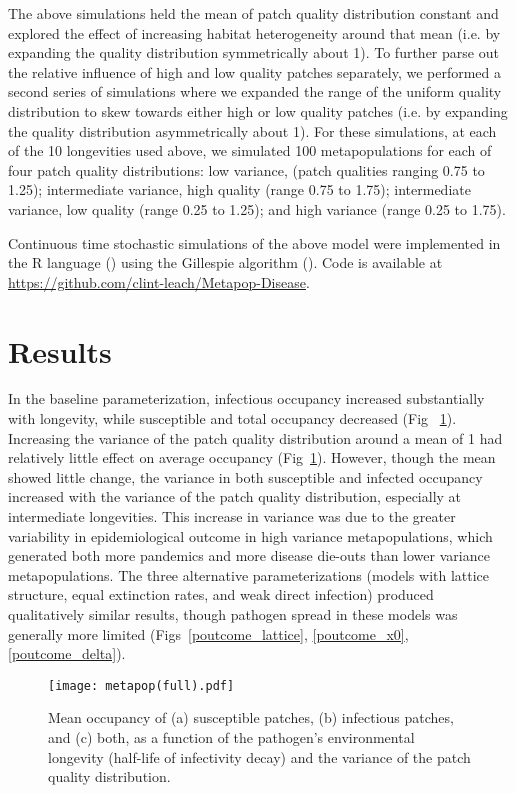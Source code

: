 \documentclass{svjour3}
\begin{document}
The above simulations held the mean of patch quality distribution constant and explored the effect of increasing habitat heterogeneity around that mean (i.e. by expanding the quality distribution symmetrically about 1).  To further parse out the relative influence of high and low quality patches separately, we performed a second series of simulations where we expanded the range of the uniform quality distribution to skew towards either high or low quality patches (i.e. by expanding the quality distribution asymmetrically about 1).  For these simulations, at each of the 10 longevities used above, we simulated 100 metapopulations for each of four patch quality distributions: low variance, (patch qualities ranging 0.75 to 1.25); intermediate variance, high quality (range 0.75 to 1.75); intermediate variance, low quality (range 0.25 to 1.25); and high variance (range 0.25 to 1.75). 

Continuous time stochastic simulations of the above model were implemented in the R language (\cite{R2014}) using the Gillespie algorithm (\cite{Gillespie1977}).  Code is available at \url{https://github.com/clint-leach/Metapop-Disease}.

\section{Results}
\label{results}

In the baseline parameterization, infectious occupancy increased substantially with longevity, while susceptible and total occupancy decreased (Fig~ \ref{poutcome}).  Increasing the variance of the patch quality distribution around a mean of 1 had relatively little effect on average occupancy (Fig~\ref{poutcome}).  However, though the mean showed little change, the variance in both susceptible and infected occupancy increased with the variance of the patch quality distribution, especially at intermediate longevities.  This increase in variance was due to the greater variability in epidemiological outcome in high variance metapopulations, which generated both more pandemics and more disease die-outs than lower variance metapopulations.  The three alternative parameterizations (models with lattice structure, equal extinction rates, and weak direct infection) produced qualitatively similar results, though pathogen spread in these models was generally more limited (Figs~\ref{poutcome_lattice}, \ref{poutcome_x0}, \ref{poutcome_delta}).

\begin{figure}
\centering
\texttt{[image: metapop(full).pdf]}
\caption{Mean occupancy of (a) susceptible patches, (b) infectious patches, and (c) both, as a function of the pathogen's environmental longevity (half-life of infectivity decay) and the variance of the patch quality distribution.}
\label{poutcome}
\end{figure}   
\end{document}
